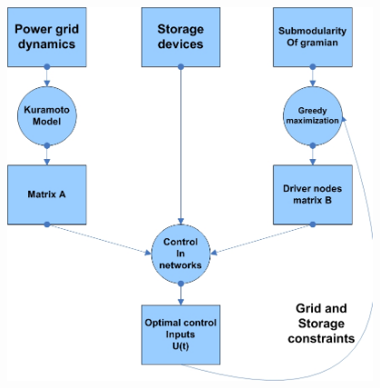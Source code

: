 \documentclass[xcolor=dvipsnames]{beamer}
\begin{document}
\begin{frame}
	\begin{columns}
		\begin{column}{.5\textwidth}
			\begin{figure}
		\includegraphics[scale=.3]{recap}
	\end{figure}
		\end{column}
		\begin{column}{.5\textwidth}

\end{column}
\end{columns}
\end{frame}
\end{document}
